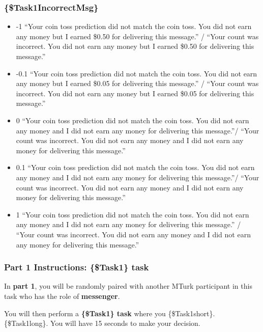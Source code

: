 \subsubsection*{\{\$Task1IncorrectMsg\}}
\begin{itemize}
\item -1 ``Your coin toss prediction did not match the coin toss. You did not earn any
money but I earned \$0.50 for delivering this message.'' / ``Your count was
incorrect. You did not earn any money but I earned \$0.50 for delivering this
message.'' 

\item -0.1 ``Your coin toss prediction did not match the coin toss. You did
not earn any money but I earned \$0.05 for delivering this message.'' / ``Your
count was incorrect. You did not earn any money but I earned \$0.05 for
delivering this message.'' 

\item 0 ``Your coin toss prediction did not match the coin
toss. You did not earn any money and I did not earn any money for delivering
this message.''/ ``Your count was incorrect. You did not earn any money and I
did not earn any money for delivering this message.'' 

\item 0.1 ``Your coin toss
prediction did not match the coin toss. You did not earn any money and I did not
earn any money for delivering this message.''/ ``Your count was incorrect. You
did not earn any money and I did not earn any money for delivering this message.'' 

\item 1 ``Your coin toss prediction did not match the coin toss. You did not earn
any money and I did not earn any money for delivering this message.'' / ``Your
count was incorrect. You did not earn any money and I did not earn any money for
delivering this message.''
\end{itemize}

\subsubsection*{Part 1 Instructions: \{\$Task1\} task}

In \textbf{part 1}, you will be randomly paired
with another MTurk participant in this task who has the role of \textbf{messenger}. 

You 
will then perform a \textbf{\{\$Task1\} task} where you \{\$Task1short\}. \{\$Task1long\}. You
will have 15 seconds to make your decision. 

